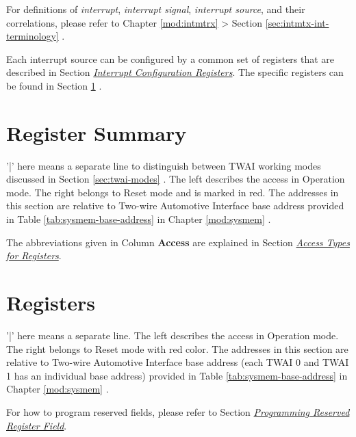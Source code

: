 \documentclass[main\_\_EN.tex]{subfiles}
\begin{document}
\begin{tiplisting}
For definitions of \textit{interrupt}, \textit{interrupt signal}, \textit{interrupt source}, and their correlations, please refer to Chapter \ref{mod:intmtrx} \textit{} > Section \ref{sec:intmtx-int-terminology} \textit{}.
\end{tiplisting}

Each interrupt source can be configured by a common set of registers that are described in Section \hyperref[interrupt-config-registers]{\textit{Interrupt Configuration Registers}}. The specific registers can be found in Section \ref{sec:twai-reg-summ} \textit{}.




\newpage
\hypertarget{twai-reg-summ}{}
\section{Register Summary}
\label{sec:twai-reg-summ}

'|' here means a separate line to distinguish between TWAI working modes discussed in Section \ref{sec:twai-modes} \textit{}. The left describes the access in Operation mode. The right belongs to Reset mode and is marked in red. The addresses in this section are relative to Two-wire Automotive Interface base address provided in Table \ref{tab:sysmem-base-address} in Chapter \ref{mod:sysmem} \textit{}.

The abbreviations given in Column \textbf{Access} are explained in Section \hyperref[glossary-access-types]{\textit{Access Types for Registers}}.






\newpage
\section{Registers}

'|' here means a separate line. The left describes the access in Operation mode. The right belongs to Reset mode with red color. The addresses in this section are relative to Two-wire Automotive Interface base address (each TWAI 0 and TWAI 1 has an individual base address) provided in Table \ref{tab:sysmem-base-address} in Chapter \ref{mod:sysmem} \textit{}.

For how to program reserved fields, please refer to Section \hyperref[programming-reserved-field]{\textit{Programming Reserved Register Field}}.


\end{document}
